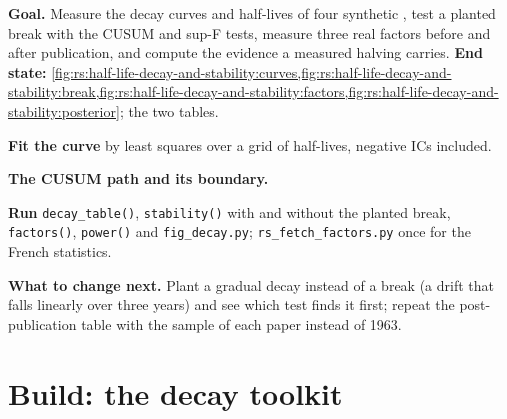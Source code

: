 \begin{tutorial}
\textbf{Goal.} Measure the decay curves and half-lives of four synthetic , test a planted break with the CUSUM and sup-F tests, measure
three real factors before and after publication, and compute the evidence a measured halving carries. \textbf{End state:}
\cref{fig:rs:half-life-decay-and-stability:curves,fig:rs:half-life-decay-and-stability:break,fig:rs:half-life-decay-and-stability:factors,fig:rs:half-life-decay-and-stability:posterior};
the two tables.
\begin{tutsteps}
\item \textbf{Fit the curve} by least squares over a grid of half-lives, negative ICs included.
\label{lst:rs:half-life-decay-and-stability:fit}
\item \textbf{The CUSUM path and its boundary.}
\label{lst:rs:half-life-decay-and-stability:cusum}
\item \textbf{Run} \texttt{decay\_table()}, \texttt{stability()} with and without the planted break, \texttt{factors()}, \texttt{power()} and
\texttt{fig\_decay.py}; \texttt{rs\_fetch\_factors.py} once for the French statistics.
\end{tutsteps}
\textbf{What to change next.} Plant a gradual decay instead of a break (a drift that falls linearly over three years) and see which test finds it
first; repeat the post-publication table with the sample of each paper instead of 1963.
\end{tutorial}

\section{Build: the decay toolkit}\label{bld:rs:half-life-decay-and-stability:decay}

